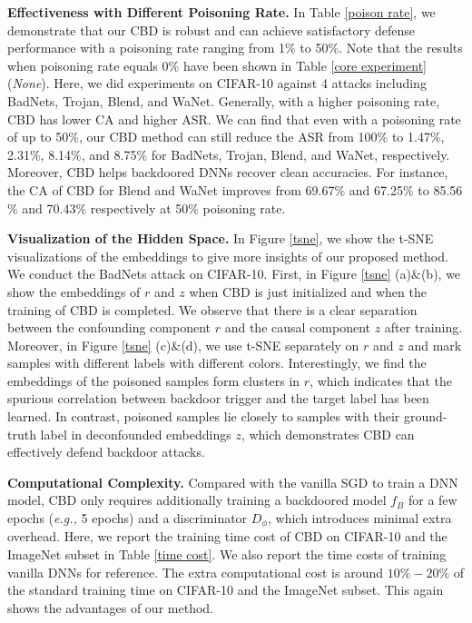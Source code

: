 \noindent\textbf{Effectiveness with Different Poisoning Rate. }In Table \ref{poison rate}, we demonstrate that our CBD is robust and can achieve satisfactory defense performance with a poisoning rate ranging from 1$\%$ to 50$\%$. Note that the results when poisoning rate equals $0\%$ have been shown in Table \ref{core experiment} (\emph{None}). Here, we did experiments on CIFAR-10
against 4 attacks including BadNets, Trojan, Blend, and WaNet. Generally, with a higher poisoning rate, CBD has lower CA and higher ASR. We can find that even with a poisoning rate of up to 50$\%$, our CBD
method can still reduce the ASR from 100$\%$ to 1.47$\%$, 2.31$\%$, 8.14$\%$, and 8.75$\%$ for BadNets, Trojan, Blend, and WaNet, respectively. Moreover, CBD helps backdoored DNNs recover clean accuracies. For instance, the CA of CBD for Blend and WaNet improves from 69.67$\%$ and 67.25$\%$ to 85.56$\%$ and 70.43$\%$ respectively at 50$\%$ poisoning rate.

\noindent \textbf{Visualization of the Hidden Space.}
In Figure \ref{tsne}, we show the t-SNE \cite{JMLR:v9:vandermaaten08a} visualizations of the embeddings to give more insights of our proposed method. We conduct the BadNets attack on CIFAR-10. First, in Figure \ref{tsne} (a)$\&$(b), we show the embeddings of $r$ and $z$ when CBD is just initialized and when the training of CBD is completed. We observe that there is a clear separation between the confounding component $r$ and the causal component $z$ after training. Moreover, in Figure \ref{tsne} (c)$\&$(d), we use t-SNE separately on $r$ and $z$ and mark samples with different labels with different colors. Interestingly, we find the embeddings of the poisoned samples form clusters in $r$, which indicates that the spurious correlation between backdoor trigger and the target label has been learned. In contrast, poisoned
samples lie closely to samples with their ground-truth label in deconfounded embeddings $z$, which demonstrates CBD can effectively defend backdoor attacks. 

\noindent \textbf{Computational Complexity. }Compared with the vanilla SGD to train a DNN model, CBD only requires additionally training a backdoored model $f_B$ for a few epochs (\emph{e.g.,} 5 epochs) and a discriminator $D_\phi$, which introduces minimal extra overhead. 
Here, we report the training time cost of CBD on CIFAR-10 and the ImageNet
subset in Table \ref{time cost}. We also report the time costs of training vanilla DNNs for reference.
The extra computational cost is around $10\%-20\%$ of the standard training time on CIFAR-10 and the ImageNet subset.  This again shows the advantages of our method.


